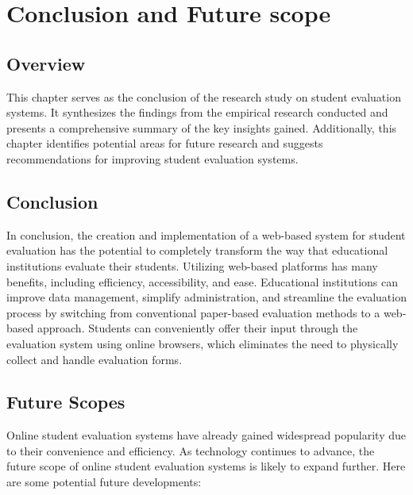 \chapter{Conclusion and Future scope}

\section{Overview}
This chapter serves as the conclusion of the research study on student evaluation systems. It synthesizes the findings from the empirical research conducted and presents a comprehensive summary of the key insights gained. Additionally, this chapter identifies potential areas for future research and suggests recommendations for improving student evaluation systems.

\section{Conclusion}
In conclusion, the creation and implementation of a web-based system for student evaluation has the potential to completely transform the way that educational institutions evaluate their students. Utilizing web-based platforms has many benefits, including efficiency, accessibility, and ease. Educational institutions can improve data management, simplify administration, and streamline the evaluation process by switching from conventional paper-based evaluation methods to a web-based approach. Students can conveniently offer their input through the evaluation system using online browsers, which eliminates the need to physically collect and handle evaluation forms.

\section{Future Scopes}
Online student evaluation systems have already gained widespread popularity due to their convenience and efficiency. As technology continues to advance, the future scope of online student evaluation systems is likely to expand further. Here are some potential future developments:

